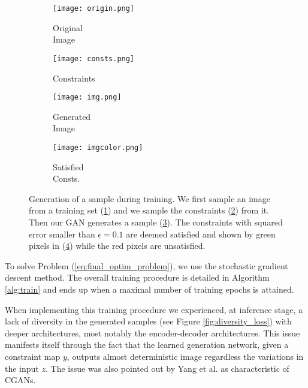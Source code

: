 \begin{figure}[t]
	\centering
	\begin{subfigure}[t]{0.25\textwidth}
		\centering
		\texttt{[image: origin.png]}
		\caption{Original\\Image}
		\label{fig:original_shoe}
	\end{subfigure}\begin{subfigure}[t]{0.25\textwidth}
		\centering
		\texttt{[image: consts.png]}
		\caption{Constraints}
		\label{fig:constraints}
	\end{subfigure}\begin{subfigure}[t]{0.25\textwidth}
		\centering
		\texttt{[image: img.png]}
		\caption{Generated\\Image}
		\label{fig:pixelwise}
	\end{subfigure}\begin{subfigure}[t]{0.24\textwidth}
		\centering
		\texttt{[image: imgcolor.png]}
		\caption{Satisfied\\Consts.}
		\label{fig:generated}
	\end{subfigure}
	\caption[Generation of a sample during training]{Generation of a sample during training. We first sample an image from a training set (\ref{fig:original_shoe}) and we sample the constraints (\ref{fig:constraints}) from it. Then our GAN generates a sample (\ref{fig:pixelwise}). The constraints with squared error smaller than $\epsilon=0.1$ are deemed satisfied and shown by green pixels in (\ref{fig:generated}) while the red pixels are unsatisfied.}
	\label{fig:image_completion}
\end{figure}



To solve Problem (\ref{eq:final_optim_problem}), we use the stochastic gradient descent method. The overall training procedure is detailed in Algorithm \ref{alg:train} and ends up when a maximal number of training epochs is attained. 

When implementing this training procedure we experienced, at inference stage, a lack of diversity in the generated samples (see Figure \ref{fig:diversity_loss}) with deeper architectures, most notably the encoder-decoder architectures. This issue manifests itself through the fact that the learned generation network, given a constraint map $y$, outputs almost deterministic image  regardless the variations in the input $z$. The issue was also pointed out by Yang et al. \cite{yang2018diversitysensitive} as characteristic of CGANs.



